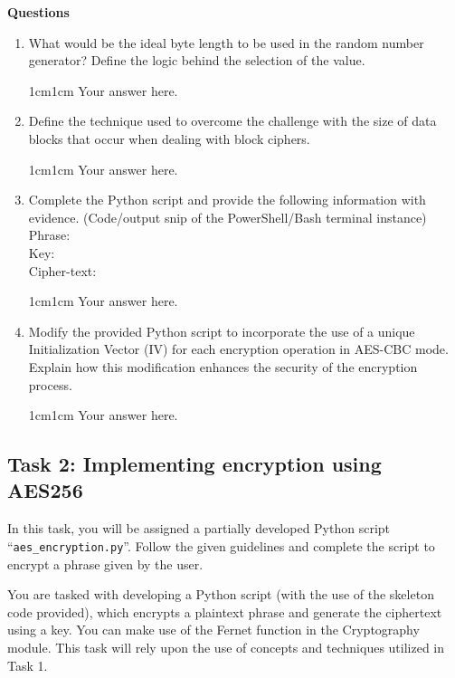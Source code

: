 \documentclass[11pt,letterpaper]{article}
\newenvironment{answer}{\em \color{blue} \begin{adjustwidth}{1cm}{1cm}}{\end{adjustwidth}}
\begin{document}
\noindent \textbf{Questions}
\medskip
\begin{enumerate}
    \item What would be the ideal byte length to be used in the random number generator? Define the logic behind the selection of the value. 
    \begin{answer}
		Your answer here.
	\end{answer}
    \item Define the technique used to overcome the challenge with the size of data blocks that occur when dealing with block ciphers. 
    \begin{answer}
		Your answer here.
	\end{answer}
    \item Complete the Python script and provide the following information with evidence. (Code/output snip of the PowerShell/Bash terminal     instance)\\ 
        Phrase: \\
        Key: \\
        Cipher-text:
        \begin{answer}
		Your answer here.
	\end{answer}
    \item Modify the provided Python script to incorporate the use of a unique Initialization Vector (IV) for each encryption operation in AES-CBC mode. Explain how this modification enhances the security of the encryption process.
    \begin{answer}
		Your answer here.
	\end{answer}

\end{enumerate}

\subsection*{Task 2: Implementing encryption using AES256}
%

In this task, you will be assigned a partially developed Python script ``\texttt{aes\_encryption.py}''. Follow the given guidelines and complete the script to encrypt a phrase given by the user.

\medskip
\noindent You are tasked with developing a Python script (with the use of the skeleton code provided), which encrypts a plaintext phrase and generate the ciphertext using a key. You can make use of the Fernet function in the Cryptography module. This task will rely upon the use of concepts and techniques utilized in Task 1.  
\end{document}
